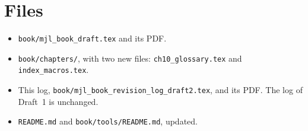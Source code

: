 \documentclass[12pt,letterpaper]{article}
\begin{document}
\section{Files}
\begin{itemize}[leftmargin=*]
\item \texttt{book/mjl\_book\_draft.tex} and its PDF.
\item \texttt{book/chapters/}, with two new files: \texttt{ch10\_glossary.tex} and \texttt{index\_macros.tex}.
\item This log, \texttt{book/mjl\_book\_revision\_log\_draft2.tex}, and its PDF. The log of Draft~1 is unchanged.
\item \texttt{README.md} and \texttt{book/tools/README.md}, updated.
\end{itemize}
\end{document}
